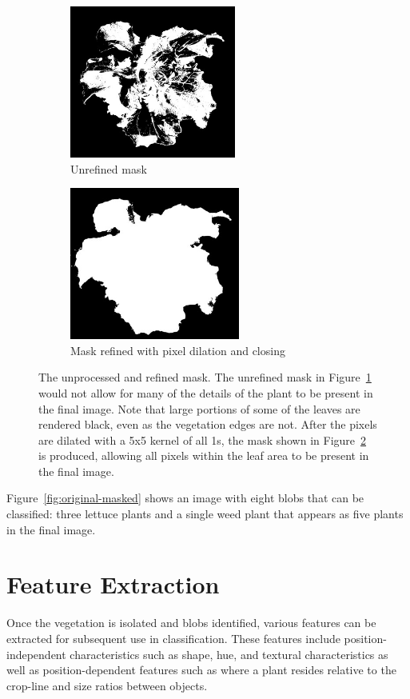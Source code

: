 \documentclass[letterpaper]{report}
\begin{document}
{\begin{figure}[h!]
	\centering
	\begin{subfigure}[h]{.48\textwidth}
	  \centering
	  \includegraphics[height=5cm]{./figures/mask-raw.jpg}
	  \caption{Unrefined mask}
	  \label{fig:mask-raw}
	\end{subfigure}
	\hfill
	\begin{subfigure}[h]{.48\textwidth}
	  \centering
	  \includegraphics[height=5cm]{./figures/mask-processed.jpg}
	  \caption{Mask refined with pixel dilation and closing}
	  \label{fig:mask-processed}
	\end{subfigure}
	\caption[Mask before and after morphological refinements]{The unprocessed and refined mask. The unrefined mask in Figure~\ref{fig:mask-raw} would not allow for many of the details of the plant to be present in the final image. Note that large portions of some of the leaves are rendered  black, even as the vegetation edges are not. After the pixels are dilated with a 5x5 kernel of all 1s, the mask shown in Figure~\ref{fig:mask-processed} is produced, allowing all pixels within the leaf area to be present in the final image.}
	\label{fig:mask-before-and-after}
\end{figure}


Figure~\ref{fig:original-masked} shows an image with  eight blobs that can be classified: three lettuce plants and a single weed plant that appears as five plants in the final image.

\section{Feature Extraction}
Once the vegetation is isolated and blobs identified, various features can be extracted for subsequent use in classification. These features include position-independent characteristics such as shape, hue, and textural characteristics as well as position-dependent features such as where a plant resides relative to the crop-line and size ratios between objects.  

}
\end{document}
